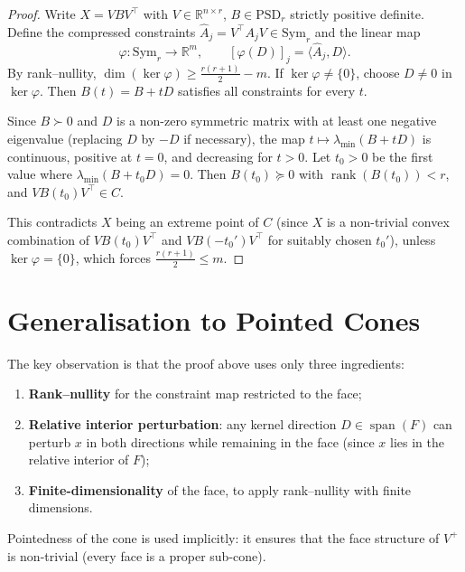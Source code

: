 \documentclass[11pt,a4paper]{article}
\theoremstyle{definition}
\newcommand{\R}{\mathbb{R}}
\newcommand{\spn}{\operatorname{span}}
\newcommand{\rank}{\operatorname{rank}}
\newcommand{\PSD}{\mathrm{PSD}}
\newcommand{\Sym}{\mathrm{Sym}}
\begin{document}
\begin{proof}
Write $X = V B V^\top$ with $V \in \R^{n \times r}$,
$B \in \PSD_r$ strictly positive definite.
Define the compressed constraints $\hat{A}_j = V^\top A_j V \in \Sym_r$
and the linear map
\[
  \varphi \colon \Sym_r \to \R^m, \qquad
  [\varphi(D)]_j = \langle \hat{A}_j, D \rangle.
\]
By rank--nullity, $\dim(\ker\varphi) \geq \frac{r(r+1)}{2} - m$.
If $\ker\varphi \neq \{0\}$, choose $D \neq 0$ in $\ker\varphi$.
Then $B(t) = B + tD$ satisfies all constraints for every $t$.

Since $B \succ 0$ and $D$ is a non-zero symmetric matrix with at least
one negative eigenvalue (replacing $D$ by $-D$ if necessary), the map
$t \mapsto \lambda_{\min}(B + tD)$ is continuous, positive at $t = 0$,
and decreasing for $t > 0$.  Let $t_0 > 0$ be the first value where
$\lambda_{\min}(B + t_0 D) = 0$.  Then $B(t_0) \succeq 0$ with
$\rank(B(t_0)) < r$, and $V B(t_0) V^\top \in C$.

This contradicts $X$ being an extreme point of $C$ (since $X$ is a
non-trivial convex combination of $V B(t_0) V^\top$ and
$V B(-t_0') V^\top$ for suitably chosen $t_0'$), unless
$\ker\varphi = \{0\}$, which forces $\frac{r(r+1)}{2} \leq m$.
\end{proof}

\section{Generalisation to Pointed Cones}

The key observation is that the proof above uses only three ingredients:
\begin{enumerate}
\item \textbf{Rank--nullity} for the constraint map restricted to the
  face;
\item \textbf{Relative interior perturbation}: any kernel direction
  $D \in \spn(F)$ can perturb $x$ in both directions while remaining
  in the face (since $x$ lies in the relative interior of $F$);
\item \textbf{Finite-dimensionality} of the face, to apply
  rank--nullity with finite dimensions.
\end{enumerate}
Pointedness of the cone is used implicitly: it ensures that the
face structure of $V^+$ is non-trivial (every face is a proper
sub-cone).
\end{document}
